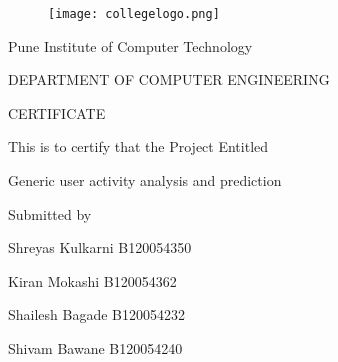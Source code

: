 \documentclass[oneside,a4paper,12pt]{book}
\begin{document}
\begin{figure}[ht]
\centering
\texttt{[image: collegelogo.png]}
\end{figure}


{\bfseries \fontsize{14}{12} \selectfont \centerline{Pune Institute of Computer Technology}
\centerline{DEPARTMENT OF COMPUTER ENGINEERING}
\vspace*{2\baselineskip}} 


{\bfseries \fontsize{16}{12} \selectfont \centerline{CERTIFICATE} 
\vspace*{2\baselineskip}} 

\centerline{This is to certify that the Project Entitled}
\vspace*{.5\baselineskip} 


{\bfseries \fontsize{14}{12} \selectfont \centerline{ }Generic user activity analysis and prediction
\vspace*{0.5\baselineskip}}

\centerline{Submitted by}
\vspace*{0.5\baselineskip} 
\centerline{Shreyas Kulkarni \hspace{27 mm} B120054350 }
\centerline{Kiran Mokashi  \hspace{25 mm}     B120054362 } 
\centerline{Shailesh Bagade \hspace{25 mm}  B120054232  } 
\centerline{Shivam Bawane \hspace{25 mm}    B120054240 }
\end{document}

